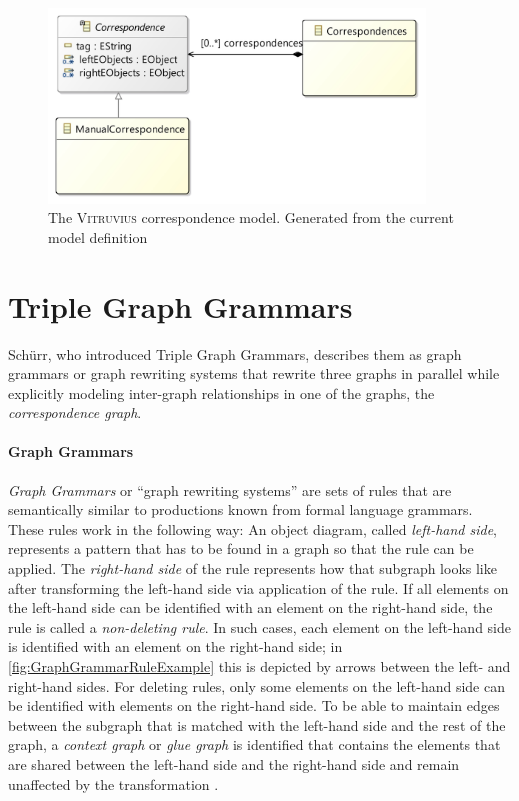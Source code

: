 \begin{figure}[h]
\centering
\includegraphics[width=10cm]{figures/vitruvius_correspondence_model.jpg}
\caption{The \textsc{Vitruvius} correspondence model. Generated from the current model definition \cite{vitruvius_correspondence_model_github_ecore}}
\label{fig:VitruviusCorrespondenceModel}
\end{figure}


\section{Triple Graph Grammars} 
\label{sec:Foundations:TGGs}

Schürr\cite{schurr_tggs_1995}, who introduced Triple Graph Grammars, describes them as graph grammars or graph rewriting systems that rewrite three graphs in parallel while explicitly modeling inter-graph relationships in one of the graphs, the \emph{correspondence graph}. 

\paragraph{Graph Grammars} \emph{Graph Grammars} or \enquote{graph rewriting systems} \cite{schurr_tggs_1995} are sets of rules that are semantically similar to productions known from formal language grammars. These rules work in the following way: 
An object diagram, called \emph{left-hand side}, represents a pattern that has to be found in a graph so that the rule can be applied.
The \emph{right-hand side} of the rule represents how that subgraph looks like after transforming the left-hand side via application of the rule.
If all elements on the left-hand side can be identified with an element on the right-hand side, the rule is called a \emph{non-deleting rule}.
In such cases, each element on the left-hand side is identified with an element on the right-hand side; in \autoref{fig:GraphGrammarRuleExample} this is depicted by arrows between the left- and right-hand sides.
For deleting rules, only some elements on the left-hand side can be identified with elements on the right-hand side. To be able to maintain edges between the subgraph that is matched with the left-hand side and the rest of the graph, a \emph{context graph} or \emph{glue graph} is identified that contains the elements that are shared between the left-hand side and the right-hand side and remain unaffected by the transformation \cite{ehrig_introduction_to_graph_grammers_1992}.

